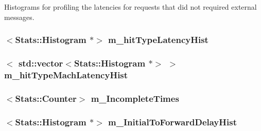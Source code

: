 \label{classSequencer_add8e2c73ddfe42f1b177e641a0e626d5}
Histograms for profiling the latencies for requests that did not required external messages. \hypertarget{classSequencer_aeecaf5411cd3b34435f621db03387b67}{
\subsubsection[{m\_\-hitTypeLatencyHist}]{$<${\bf Stats::Histogram} $\ast$$>$ {\bf m\_\-hitTypeLatencyHist}}}
\label{classSequencer_aeecaf5411cd3b34435f621db03387b67}
\hypertarget{classSequencer_aaf855f02483dc21743651007a759ea77}{
\subsubsection[{m\_\-hitTypeMachLatencyHist}]{$<$ {\bf std::vector}$<${\bf Stats::Histogram} $\ast$$>$ $>$ {\bf m\_\-hitTypeMachLatencyHist}}}
\label{classSequencer_aaf855f02483dc21743651007a759ea77}
\hypertarget{classSequencer_a42ce5f1f915ac19c7e7575172f28e412}{
\subsubsection[{m\_\-IncompleteTimes}]{$<${\bf Stats::Counter}$>$ {\bf m\_\-IncompleteTimes}}}
\label{classSequencer_a42ce5f1f915ac19c7e7575172f28e412}
\hypertarget{classSequencer_a0dbfb83f6edf61cad3d0aebdc89ed370}{
\subsubsection[{m\_\-InitialToForwardDelayHist}]{$<${\bf Stats::Histogram} $\ast$$>$ {\bf m\_\-InitialToForwardDelayHist}}}
